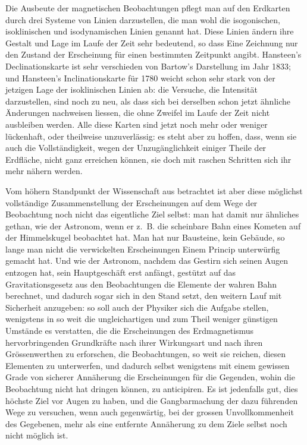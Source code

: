 \documentclass[fontsize=11pt,paper=a4,twoside,openany]{scrbook}
\begin{document}
Die Ausbeute der magnetischen Beobachtungen pflegt man auf den Erdkarten durch drei Systeme von Linien darzustellen, die man wohl die isogonischen, isoklinischen und isodynamischen Linien genannt hat. Diese Linien ändern ihre Gestalt und Lage im Laufe der Zeit sehr bedeutend, so dass Eine Zeichnung nur den Zustand der Erscheinung für einen bestimmten Zeitpunkt angibt. Hansteen's Declinationskarte ist sehr verschieden von Bartow's Darstellung im Jahr 1833; und Hansteen's Inclinationskarte für 1780 weicht schon sehr stark von der jetzigen Lage der isoklinischen Linien ab: die Versuche, die Intensität darzustellen, sind noch zu neu, als dass sich bei derselben schon jetzt ähnliche Änderungen nachweisen liessen, die ohne Zweifel im Laufe der Zeit nicht ausbleiben werden. Alle diese Karten sind jetzt noch mehr oder weniger lückenhaft, oder theilweise unzuverlässig: es steht aber zu hoffen, dass, wenn sie auch die Vollständigkeit, wegen der Unzugänglichkeit einiger Theile der Erdfläche, nicht ganz erreichen können, sie doch mit raschen Schritten sich ihr mehr nähern werden.

Vom höhern Standpunkt der Wissenschaft aus betrachtet ist aber diese möglichst vollständige Zusammenstellung der Erscheinungen auf dem Wege der Beobachtung noch nicht das eigentliche Ziel selbst: man hat damit nur ähnliches gethan, wie der Astronom, wenn er z.~B. die scheinbare Bahn eines Kometen auf der Himmelskugel beobachtet hat. Man hat nur Bausteine, kein Gebäude, so lange man nicht die verwickelten Erscheinungen Einem Princip unterwürfig gemacht hat. Und wie der Astronom, nachdem das Gestirn sich seinen Augen entzogen hat, sein Hauptgeschäft erst anfängt, gestützt auf das Gravitationsgesetz aus den Beobachtungen die Elemente der wahren Bahn berechnet, und dadurch sogar sich in den Stand setzt, den weitern Lauf mit Sicherheit anzugeben: so soll auch der Physiker sich die Aufgabe stellen, wenigstens in so weit die ungleichartigen und zum Theil weniger günstigen Umstände es verstatten, die die Erscheinungen des Erdmagnetismus hervorbringenden Grundkräfte nach ihrer Wirkungsart und nach ihren Grössenwerthen zu erforschen, die Beobachtungen, so weit sie reichen, diesen Elementen zu unterwerfen, und dadurch selbst wenigstens mit einem gewissen Grade von sicherer Annäherung die Erscheinungen für die Gegenden, wohin die Beobachtung nicht hat dringen können, zu anticipiren. Es ist jedenfalls gut, dies höchste Ziel vor Augen zu haben, und die Gangbarmachung der dazu führenden Wege zu versuchen, wenn auch gegenwärtig, bei der grossen Unvollkommenheit des Gegebenen, mehr als eine entfernte Annäherung zu dem Ziele selbst noch nicht möglich ist.
\end{document}
